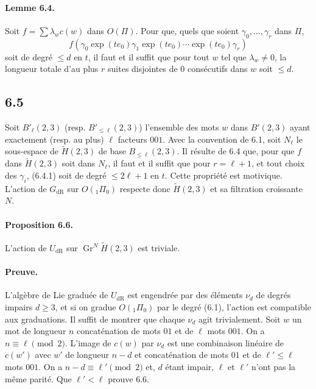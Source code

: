 \documentclass[10pt]{article}
\newcommand{\dR}{\mathrm{dR}}
\begin{document}
\paragraph{Lemme 6.4.}
Soit $f=\sum\lambda_w c(w)$ dans $O(\Pi)$. Pour que, quels que soient $\gamma_0,\ldots,\gamma_r$ dans $\Pi$,
\begin{equation}
f(\gamma_0\exp(te_0)\gamma_1\exp(te_0)\cdots\exp(te_0)\gamma_r)
\tag{6.4.1}
\end{equation}
soit de degré $\leq d$ en $t$, il faut et il suffit que pour tout $w$ tel que $\lambda_w\ne0$, la longueur totale d'au plus $r$ suites disjointes de $0$ consécutifs dans $w$ soit $\leq d$.

\subsection*{6.5}
Soit $B'_{\ell}(2,3)$ (resp. $B'_{\leq\ell}(2,3)$) l'ensemble des mots $w$ dans $B'(2,3)$ ayant exactement (resp. au plus) $\ell$ facteurs $001$. Avec la convention de 6.1, soit $N_{\ell}$ le sous-espace de $\widetilde H(2,3)$ de base $B_{\leq\ell}(2,3)$. Il résulte de 6.4 que, pour que $f$ dans $\widetilde H(2,3)$ soit dans $N_{\ell}$, il faut et il suffit que pour $r=\ell+1$, et tout choix des $\gamma_i$, (6.4.1) soit de degré $\leq2\ell+1$ en $t$. Cette propriété est motivique. L'action de $G_{\dR}$ sur $O({}_1\Pi_0)$ respecte donc $\widetilde H(2,3)$ et sa filtration croissante $N$.

\paragraph{Proposition 6.6.}
L'action de $U_{\dR}$ sur $\operatorname{Gr}^N\widetilde H(2,3)$ est triviale.

\paragraph{Preuve.}
L'algèbre de Lie graduée de $U_{\dR}$ est engendrée par des éléments $\nu_d$ de degrés impairs $d\geq3$, et si on gradue $O({}_1\Pi_0)$ par le degré (6.1), l'action est compatible aux graduations. Il suffit de montrer que chaque $\nu_d$ agit trivialement. Soit $w$ un mot de longueur $n$ concaténation de mots $01$ et de $\ell$ mots $001$. On a $n\equiv\ell\pmod 2$. L'image de $c(w)$ par $\nu_d$ est une combinaison linéaire de $c(w')$ avec $w'$ de longueur $n-d$ et concaténation de mots $01$ et de $\ell'\leq\ell$ mots $001$. On a $n-d\equiv\ell'\pmod 2$ et, $d$ étant impair, $\ell$ et $\ell'$ n'ont pas la même parité. Que $\ell'<\ell$ prouve 6.6.
\end{document}
